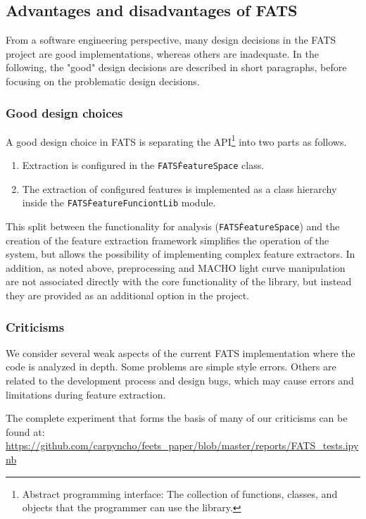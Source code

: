 \documentclass[final,5p,times,twocolumn,authoryear]{elsarticle}
\begin{document}
\subsection{Advantages and disadvantages of FATS}
\label{section:light_shadows}
%
From a software engineering perspective, many design decisions 
in the FATS project are good implementations, whereas others are inadequate. 
%
In the following, the "good" design decisions are described in short
paragraphs, before focusing on the problematic
design decisions. 

\subsubsection{Good design choices}
\label{good_design_choices}
%
A good design choice in FATS is separating the 
API\footnote{Abstract programming interface: The collection of functions, classes, 
and objects that the programmer can use the library.} into two parts as follows.
%
\begin{enumerate}
\item Extraction is configured in the \texttt{FATS\.FeatureSpace} class.
\item The extraction of configured features is implemented as a class hierarchy 
      inside the \texttt{FATS\.FeatureFunciontLib} module.
\end{enumerate}
%
This split between the functionality for analysis (\texttt{FATS\.FeatureSpace}) and
the creation of the feature extraction framework simplifies the operation of the system,
but allows the possibility of implementing complex feature extractors.
%
In addition, as noted above, preprocessing and MACHO light curve manipulation are not
associated directly with the core functionality of the library, but instead they are provided as an 
additional option in the project.

\subsubsection{Criticisms}
\label{section:criticism}
%
We consider several weak aspects of the current FATS implementation where 
the code is analyzed in depth.
Some problems are simple style errors. 
Others are related to the development process and 
design bugs, which may cause errors and limitations during feature extraction.

The complete experiment that forms the basis of many of our criticisms can be 
found at: 
\url{https://github.com/carpyncho/feets\_paper/blob/master/reports/FATS\_tests.ipynb}
\end{document}
